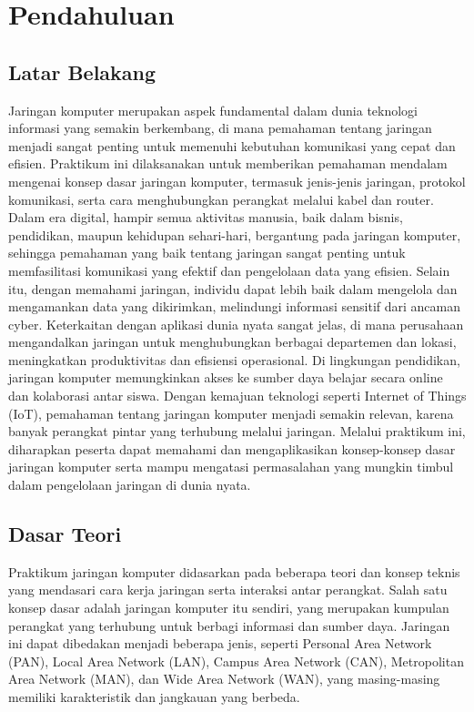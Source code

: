 \section{Pendahuluan}
\subsection{Latar Belakang}
Jaringan komputer merupakan aspek fundamental dalam dunia teknologi informasi yang semakin berkembang, di mana pemahaman tentang jaringan menjadi sangat penting untuk memenuhi kebutuhan komunikasi yang cepat dan efisien. Praktikum ini dilaksanakan untuk memberikan pemahaman mendalam mengenai konsep dasar jaringan komputer, termasuk jenis-jenis jaringan, protokol komunikasi, serta cara menghubungkan perangkat melalui kabel dan router. Dalam era digital, hampir semua aktivitas manusia, baik dalam bisnis, pendidikan, maupun kehidupan sehari-hari, bergantung pada jaringan komputer, sehingga pemahaman yang baik tentang jaringan sangat penting untuk memfasilitasi komunikasi yang efektif dan pengelolaan data yang efisien. Selain itu, dengan memahami jaringan, individu dapat lebih baik dalam mengelola dan mengamankan data yang dikirimkan, melindungi informasi sensitif dari ancaman cyber. Keterkaitan dengan aplikasi dunia nyata sangat jelas, di mana perusahaan mengandalkan jaringan untuk menghubungkan berbagai departemen dan lokasi, meningkatkan produktivitas dan efisiensi operasional. Di lingkungan pendidikan, jaringan komputer memungkinkan akses ke sumber daya belajar secara online dan kolaborasi antar siswa. Dengan kemajuan teknologi seperti Internet of Things (IoT), pemahaman tentang jaringan komputer menjadi semakin relevan, karena banyak perangkat pintar yang terhubung melalui jaringan. Melalui praktikum ini, diharapkan peserta dapat memahami dan mengaplikasikan konsep-konsep dasar jaringan komputer serta mampu mengatasi permasalahan yang mungkin timbul dalam pengelolaan jaringan di dunia nyata.

\subsection{Dasar Teori}
Praktikum jaringan komputer didasarkan pada beberapa teori dan konsep teknis yang mendasari cara kerja jaringan serta interaksi antar perangkat. Salah satu konsep dasar adalah jaringan komputer itu sendiri, yang merupakan kumpulan perangkat yang terhubung untuk berbagi informasi dan sumber daya. Jaringan ini dapat dibedakan menjadi beberapa jenis, seperti Personal Area Network (PAN), Local Area Network (LAN), Campus Area Network (CAN), Metropolitan Area Network (MAN), dan Wide Area Network (WAN), yang masing-masing memiliki karakteristik dan jangkauan yang berbeda.

